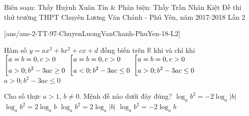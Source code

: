 \begin{name}
{Biên soạn: Thầy Huỳnh Xuân Tín \& Phản biện: Thầy Trần Nhân Kiệt}
{Đề thi thử trường THPT Chuyên Lương Văn Chánh - Phú Yên, năm 2017-2018 Lần 2 }
\end{name}
\setcounter{ex}{0}\setcounter{bt}{0}
[ans/ans-2-TT-97-ChuyenLuongVanChanh-PhuYen-18-L2]

\begin{ex}%
	Hàm số $y=ax^3+bx^2+cx+d$ đồng biến trên $\mathbb{R}$ khi và chỉ khi
	\choice
	{$\left[\begin{aligned}& a=b=0,c>0 \\ & a>0;b^2-3ac\ge 0\end{aligned}\right.$}
	{$\left[\begin{aligned}& a=b=0,c>0 \\ & a<0;b^2-3ac\le 0\end{aligned}\right.$}
	{\True $\left[\begin{aligned}& a=b=0,c>0 \\ & a>0;b^2-3ac\le 0\end{aligned}\right.$}
	{$a>0;b^2-3ac\le 0$}
\end{ex}

\begin{ex}%
	Cho số thực $a>1$, $b\neq 0$. Mệnh đề nào dưới đây đúng?
	\choice
	{$\log_ab^2=-2\log_a|b|$}
	{$\log_ab^2=2\log_ab$}
	{\True $\log_ab^2=2\log_a|b|$}
	{$\log_ab^2=-2\log_ab$}
\end{ex}



